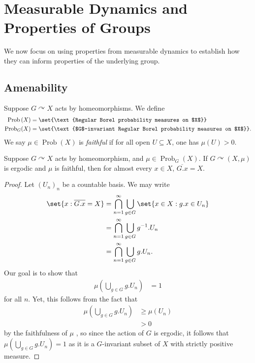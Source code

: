 \documentclass[10pt]{mypackage}
\begin{document}
\section{Measurable Dynamics and Properties of Groups}%
We now focus on using properties from measurable dynamics to establish how they can inform properties of the underlying group.
\subsection{Amenability}%
\begin{definition}
Suppose $G\curvearrowright X$ acts by homeomorphisms. We define
\begin{align*}
  \operatorname{Prob}\left( X \right) &= \set{\text{Regular Borel probability measures on $X$}}\\
  \operatorname{Prob}_G(X) &= \set{\text{$G$-invariant Regular Borel probability measures on $X$}}.
\end{align*}
We say $\mu\in \operatorname{Prob}\left( X \right)$ is \textit{faithful} if for all open $U\subseteq X$, one has $\mu\left( U \right) > 0$.
\end{definition}
\begin{proposition}
  Suppose $G\curvearrowright X$ acts by homeomorphism, and $\mu\in \operatorname{Prob}_G(X)$. If $G\curvearrowright \left( X,\mu \right)$ is ergodic and $\mu$ is faithful, then for almost every $x\in X$, $ \overline{G.x} = X $.
\end{proposition}
\begin{proof}
  Let $\left( U_n \right)_n$ be a countable basis. We may write
  \begin{align*}
    \set{x : \overline{G.x} = X} &= \bigcap_{n=1}^{\infty}\bigcup_{g\in G}\set{x\in X : g.x\in U_n}\\
                                 &= \bigcap_{n=1}^{\infty}\bigcup_{g\in G}g^{-1}.U_n\\
                                 &= \bigcap_{n=1}^{\infty}\bigcup_{g\in G}g.U_n.
  \end{align*}
  Our goal is to show that
  \begin{align*}
    \mu\left( \bigcup_{g\in G}g.U_n \right) &= 1
  \end{align*}
  for all $n$. Yet, this follows from the fact that
  \begin{align*}
    \mu\left( \bigcup_{g\in G}g.U_n \right) &\geq \mu\left( U_n \right)\\
                                            &> 0
  \end{align*}
  by the faithfulness of $\mu$ , so since the action of $G$ is ergodic, it follows that $\mu\left( \bigcup_{g\in G}g.U_n \right) = 1$ as it is a $G$-invariant subset of $X$ with strictly positive measure.
\end{proof}
\end{document}
